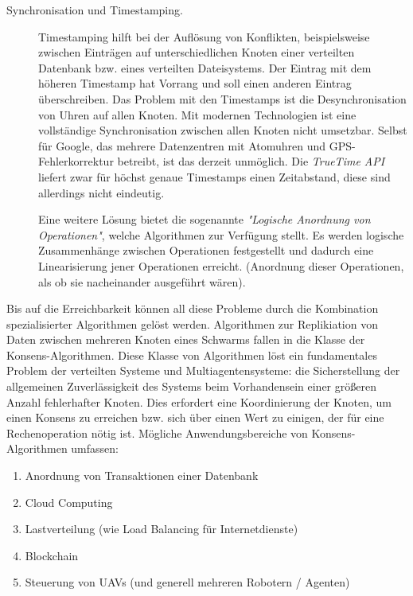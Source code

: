 \begin{description}
	\item[Synchronisation und Timestamping.] Timestamping hilft bei der Auflösung von Konflikten, beispielsweise zwischen Einträgen auf unterschiedlichen Knoten einer verteilten Datenbank bzw. eines verteilten Dateisystems. Der Eintrag mit dem höheren Timestamp hat Vorrang und soll einen anderen Eintrag überschreiben. Das Problem mit den Timestamps ist die Desynchronisation von Uhren auf allen Knoten. Mit modernen Technologien ist eine vollständige Synchronisation zwischen allen Knoten nicht umsetzbar. Selbst für Google, das mehrere Datenzentren mit Atomuhren und GPS-Fehlerkorrektur betreibt, ist das derzeit unmöglich. Die \textit{TrueTime API} liefert zwar für höchst genaue Timestamps einen Zeitabstand, diese sind allerdings nicht eindeutig.
	
	Eine weitere Lösung bietet die sogenannte \textit{"Logische Anordnung von Operationen"}, welche Algorithmen zur Verfügung stellt. Es werden logische Zusammenhänge zwischen Operationen festgestellt und dadurch eine Linearisierung jener Operationen erreicht. (Anordnung dieser Operationen, als ob sie nacheinander ausgeführt wären).
\end{description}

Bis auf die Erreichbarkeit können all diese Probleme durch die Kombination spezialisierter Algorithmen gelöst werden. Algorithmen zur Replikiation von Daten zwischen mehreren Knoten eines Schwarms fallen in die Klasse der Konsens-Algorithmen. Diese Klasse von Algorithmen löst ein fundamentales Problem der verteilten Systeme und Multiagentensysteme: die Sicherstellung der allgemeinen Zuverlässigkeit des Systems beim Vorhandensein einer größeren Anzahl fehlerhafter Knoten. Dies erfordert eine Koordinierung der Knoten, um einen Konsens zu erreichen bzw. sich über einen Wert zu einigen, der für eine Rechenoperation nötig ist. Mögliche Anwendungsbereiche von Konsens-Algorithmen umfassen:

\begin{enumerate}
	\item Anordnung von Transaktionen einer Datenbank
	
	\item Cloud Computing
	
	\item Lastverteilung (wie Load Balancing für Internetdienste)
	
	\item Blockchain
	
	\item Steuerung von UAVs (und generell mehreren Robotern / Agenten)
\end{enumerate}

